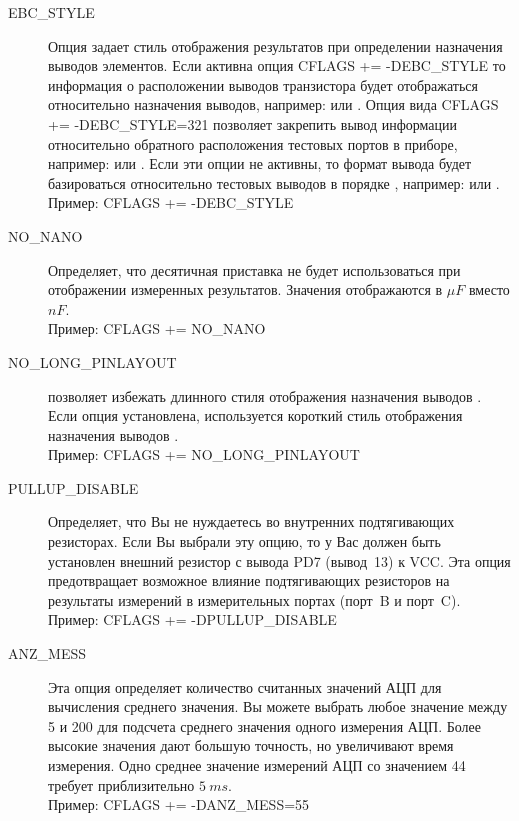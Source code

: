 \begin{description}
  \item[EBC\_STYLE] Опция задает стиль отображения результатов при определении назначения выводов элементов. 
Если активна опция CFLAGS += -DEBC\_STYLE то информация о расположении выводов транзистора будет 
отображаться относительно назначения выводов, например:  или . Опция вида 
CFLAGS += -DEBC\_STYLE=321 позволяет закрепить вывод информации относительно обратного расположения 
тестовых портов в приборе, например:  или . Если эти опции не активны, то формат вывода 
будет базироваться относительно тестовых выводов в порядке , например:  или
.\\
Пример: CFLAGS += -DEBC\_STYLE
 
  \item[NO\_NANO] Определяет, что десятичная приставка  не будет использоваться при отображении измеренных 
результатов. Значения отображаются в \(\mu F\) вместо \(nF\).\\
Пример: CFLAGS += NO\_NANO

  \item[NO\_LONG\_PINLAYOUT] позволяет избежать длинного стиля отображения назначения выводов .
  Если опция установлена, используется короткий стиль отображения назначения выводов .\\
Пример: CFLAGS += NO\_LONG\_PINLAYOUT

  \item[PULLUP\_DISABLE] Определяет, что Вы не нуждаетесь во внутренних подтягивающих резисторах. Если Вы выбрали 
эту опцию, то у Вас должен быть установлен внешний резистор с вывода PD7 (вывод~13) к VCC. Эта опция предотвращает 
возможное влияние подтягивающих резисторов на результаты измерений в измерительных портах (порт~B и порт~C).\\
Пример: CFLAGS += -DPULLUP\_DISABLE

  \item[ANZ\_MESS] Эта опция определяет количество считанных значений АЦП для вычисления среднего значения. 
Вы можете выбрать любое значение между 5 и 200 для подсчета среднего значения одного измерения АЦП. Более 
высокие значения дают большую точность, но увеличивают время измерения. Одно среднее значение измерений АЦП 
со значением 44 требует приблизительно \(5~ms\).\\
Пример: CFLAGS += -DANZ\_MESS=55


\end{description}
